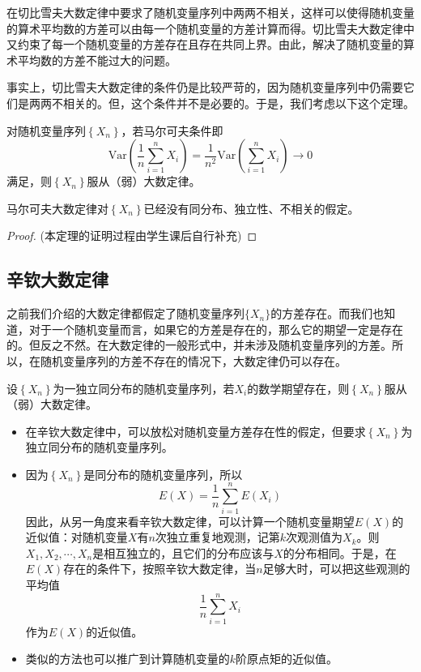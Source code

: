 在切比雪夫大数定律中要求了随机变量序列中两两不相关，这样可以使得随机变量的算术平均数的方差可以由每一个随机变量的方差计算而得。切比雪夫大数定律中又约束了每一个随机变量的方差存在且存在共同上界。由此，解决了随机变量的算术平均数的方差不能过大的问题。

事实上，切比雪夫大数定律的条件仍是比较严苛的，因为随机变量序列中仍需要它们是两两不相关的。但，这个条件并不是必要的。于是，我们考虑以下这个定理。
\begin{theorem}[马尔可夫大数定律]
对随机变量序列$\left \{ X_{n} \right \} $，若马尔可夫条件即$$
\text{Var}\left(\frac{1}{n}\sum_{i=1}^{n}X_{i}  \right)=\frac{1}{n^{2}} \text{Var}\left(\sum_{i=1}^{n}X_{i}  \right)\rightarrow 0$$满足，则$\left \{ X_{n} \right \}$服从（弱）大数定律。
\end{theorem}
\begin{remark}
马尔可夫大数定律对$\left \{ X_{n} \right \} $已经没有同分布、独立性、不相关的假定。
\end{remark}
\begin{proof}(本定理的证明过程由学生课后自行补充)
    \vspace{3cm}
\end{proof}
\subsection{辛钦大数定律}
之前我们介绍的大数定律都假定了随机变量序列$\{X_n\}$的方差存在。而我们也知道，对于一个随机变量而言，如果它的方差是存在的，那么它的期望一定是存在的。但反之不然。在大数定律的一般形式中，并未涉及随机变量序列的方差。所以，在随机变量序列的方差不存在的情况下，大数定律仍可以存在。
\begin{theorem}[辛钦大数定律]
设$\left \{ X_{n} \right \} $为一独立同分布的随机变量序列，若$X_{i}$的数学期望存在，则$\left \{ X_{n} \right \} $服从（弱）大数定律。
\end{theorem}
\begin{remark}
\begin{itemize}
    \item 在辛钦大数定律中，可以放松对随机变量方差存在性的假定，但要求$\left \{ X_{n} \right \} $为独立同分布的随机变量序列。
    \item 因为$\left \{ X_{n} \right \} $是同分布的随机变量序列，所以$$E(X)=\frac{1}{n}\sum_{i=1}^{n}E(X_{i})  $$
    因此，从另一角度来看辛钦大数定律，可以计算一个随机变量期望$E(X)$的近似值：对随机变量$X$有$n$次独立重复地观测，记第$k$次观测值为$X_{k}$。则$X_{1},X_{2},\cdots,X_{n}$是相互独立的，且它们的分布应该与$X$的分布相同。于是，在$E(X)$存在的条件下，按照辛钦大数定律，当$n$足够大时，可以把这些观测的平均值$$\frac{1}{n}\sum_{i=1}^{n}X_{i}$$作为$E(X)$的近似值。
    \item 类似的方法也可以推广到计算随机变量的$k$阶原点矩的近似值。
\end{itemize}
\end{remark}


